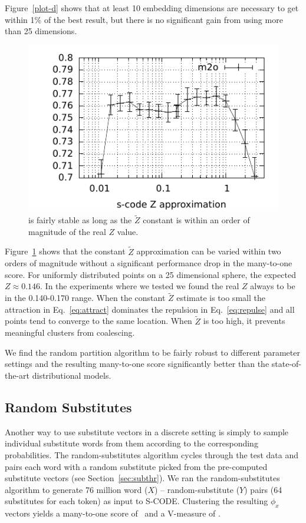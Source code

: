 Figure~\ref{plot-d} shows that at least 10 embedding dimensions are
necessary to get within 1\% of the best result, but there is no
significant gain from using more than 25 dimensions.

\begin{figure}[ht] \centering
\includegraphics[width=0.5\linewidth]{plot-z.pdf}
\caption{\mto is fairly stable as long as the $\tilde{Z}$ constant is
  within an order of magnitude of the real $Z$ value.}
\label{plot-z}
\end{figure}

Figure~\ref{plot-z} shows that the constant $\tilde{Z}$ approximation
can be varied within two orders of magnitude without a significant
performance drop in the many-to-one score.  For uniformly distributed
points on a 25 dimensional sphere, the expected $Z\approx 0.146$.  In
the experiments where we tested we found the real $Z$ always to be in
the 0.140-0.170 range.  When the constant $\tilde{Z}$ estimate is too
small the attraction in Eq.~\ref{eq:attract} dominates the repulsion
in Eq.~\ref{eq:repulse} and all points tend to converge to the same
location.  When $\tilde{Z}$ is too high, it prevents meaningful
clusters from coalescing.

We find the random partition algorithm to be fairly robust to
different parameter settings and the resulting many-to-one score
significantly better than the state-of-the-art distributional models.

\subsection{Random Substitutes}\label{sec:wordsub}

Another way to use substitute vectors in a discrete setting is simply
to sample individual substitute words from them according to the
corresponding probabilities.  The random-substitutes algorithm cycles
through the test data and pairs each word with a random substitute
picked from the pre-computed substitute vectors (see
Section~\ref{sec:subthr}).  We ran the random-substitutes algorithm to
generate 76 million word ($X$) -- random-substitute ($Y$) pairs (64
substitutes for each token) as input to S-CODE.  Clustering the
resulting $\phi_x$ vectors yields a many-to-one score of \wsmto\ and a
V-measure of \wsvm.

